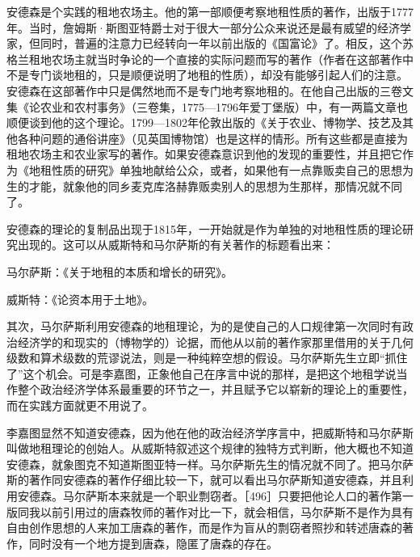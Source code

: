 安德森是个实践的租地农场主。他的第一部顺便考察地租性质的著作，出版于1777年。当时，詹姆斯·斯图亚特爵士对于很大一部分公众来说还是最有威望的经济学家，但同时，普遍的注意力已经转向一年以前出版的《国富论》了。相反，这个苏格兰租地农场主就当时争论的一个直接的实际问题而写的著作（作者在这部著作中不是专门谈地租的，只是顺便说明了地租的性质），却没有能够引起人们的注意。安德森在这部著作中只是偶然地而不是专门地考察地租的。在他自己出版的三卷文集《论农业和农村事务》（三卷集，1775—1796年爱丁堡版）中，有一两篇文章也顺便谈到他的这个理论。1799—1802年伦敦出版的《关于农业、博物学、技艺及其他各种问题的通俗讲座》（见英国博物馆）也是这样的情形。所有这些都是直接为租地农场主和农业家写的著作。如果安德森意识到他的发现的重要性，并且把它作为《地租性质的研究》单独地献给公众，或者，如果他有一点靠贩卖自己的思想为生的才能，就象他的同乡麦克库洛赫靠贩卖别人的思想为生那样，那情况就不同了。

安德森的理论的复制品出现于1815年，一开始就是作为单独的对地租性质的理论研究出现的。这可以从威斯特和马尔萨斯的有关著作的标题看出来：

马尔萨斯：《关于地租的本质和增长的研究》。

威斯特：《论资本用于土地》。

其次，马尔萨斯利用安德森的地租理论，为的是使自己的人口规律第一次同时有政治经济学的和现实的（博物学的）论据，而他从以前的著作家那里借用的关于几何级数和算术级数的荒谬说法，则是一种纯粹空想的假设。马尔萨斯先生立即“抓住了”这个机会。可是李嘉图，正象他自己在序言中说的那样，是把这个地租学说当作整个政治经济学体系最重要的环节之一，并且赋予它以崭新的理论上的重要性，而在实践方面就更不用说了。

李嘉图显然不知道安德森，因为他在他的政治经济学序言中，把威斯特和马尔萨斯叫做地租理论的创始人。从威斯特叙述这个规律的独特方式判断，他大概也不知道安德森，就象图克不知道斯图亚特一样。马尔萨斯先生的情况就不同了。把马尔萨斯的著作同安德森的著作仔细比较一下，就可以看出马尔萨斯知道安德森，并且利用安德森。马尔萨斯本来就是一个职业剽窃者。［496］只要把他论人口的著作第一版同我以前引用过的唐森牧师的著作对比一下，就会相信，马尔萨斯不是作为具有自由创作思想的人来加工唐森的著作，而是作为盲从的剽窃者照抄和转述唐森的著作，同时没有一个地方提到唐森，隐匿了唐森的存在。

